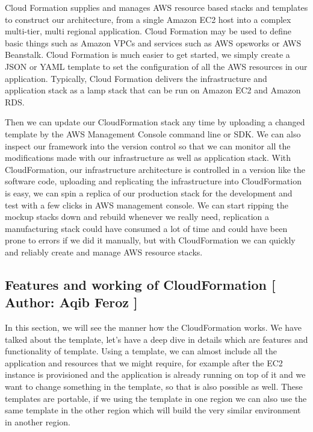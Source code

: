 Cloud Formation supplies and manages AWS resource based stacks and templates to construct our architecture, from a single Amazon EC2 host into a complex multi-tier, multi regional application. Cloud Formation may be used to define basic things such as Amazon VPCs and services such as AWS opsworks or AWS Beanstalk. Cloud Formation is much easier to get started, we simply create a JSON or YAML template to set the configuration of all the AWS resources in our application. Typically, Cloud Formation delivers the infrastructure and application stack as a lamp stack that can be run on Amazon EC2 and Amazon RDS.

Then we can update our CloudFormation stack any time by uploading a changed template by the AWS Management Console command line or SDK. We can also inspect our framework into the version control so that we can monitor all the modifications made with our infrastructure as well as application stack. With CloudFormation, our infrastructure architecture is controlled in a version like the software code, uploading and replicating the infrastructure into CloudFormation is easy, we can spin a replica of our production stack for the development and test with a few clicks in AWS management console. We can start ripping the mockup stacks down and rebuild whenever we really need, replication a manufacturing stack could have consumed a lot of time and could have been prone to errors if we did it manually, but with CloudFormation we can quickly and reliably create and manage AWS resource stacks.

\subsection{Features and working of CloudFormation [ Author: Aqib Feroz ]}
In this section, we will see the manner how the CloudFormation works. We have talked about the template, let’s have a deep dive in details which are features and functionality of template. Using a template, we can almost include all the application and resources that we might require, for example after the EC2 instance is provisioned and the application is already running on top of it and we want to change something in the template, so that is also possible as well. These templates are portable, if we using the template in one region we can also use the same template in the other region which will build the very similar environment in another region.

